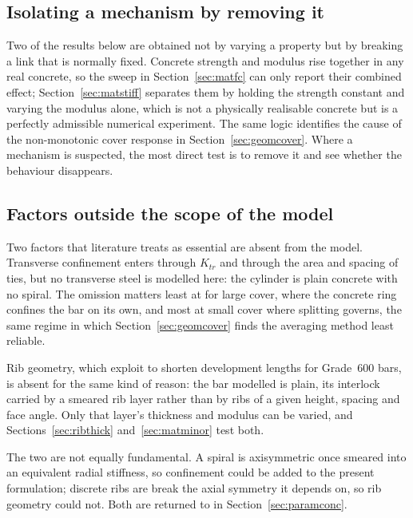 \subsection{Isolating a mechanism by removing it}

Two of the results below are obtained not by varying a property but by
breaking a link that is normally fixed. Concrete strength and modulus rise
together in any real concrete, so the sweep in Section~\ref{sec:matfc} can
only report their combined effect; Section~\ref{sec:matstiff} separates them
by holding the strength constant and varying the modulus alone, which is not
a physically realisable concrete but is a perfectly admissible numerical
experiment. The same logic identifies the cause of the non-monotonic cover
response in Section~\ref{sec:geomcover}. Where a mechanism is suspected, the
most direct test is to remove it and see whether the behaviour disappears.

\subsection{Factors outside the scope of the model}
\label{sec:outofscope}
Two factors that literature treats as essential are absent from the
model. Transverse confinement enters \textcite{orangunStrengthAnchoredBars}
through $K_{tr}$ and \textcite{408R03BondDevelopment} through the area and
spacing of ties, but no transverse steel is modelled here: the cylinder is
plain concrete with no spiral. The omission matters least at for large
cover, where the concrete ring confines the bar on its own, and most at
small cover where splitting governs, the same regime in which
Section~\ref{sec:geomcover} finds the averaging method least reliable.

Rib geometry, which \textcite{ngCustomisedRibPattern} exploit to shorten
development lengths for Grade~600 bars, is absent for the same kind of
reason: the bar modelled is plain, its interlock carried by a smeared rib
layer rather than by ribs of a given height, spacing and face angle. Only
that layer's thickness and modulus can be varied, and
Sections~\ref{sec:ribthick} and~\ref{sec:matminor} test both.

The two are not equally fundamental. A spiral is axisymmetric once smeared
into an equivalent radial stiffness, so confinement could be added to the
present formulation; discrete ribs are break the axial symmetry
it depends on, so rib geometry could not. Both are returned to in
Section~\ref{sec:paramconc}.


